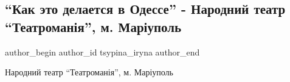  
 
 
 
 
 
\subsection{\enquote{Как это делается в Одессе} - Народний театр \enquote{Театроманія}, м. Маріуполь}
\label{sec:19_09_2018.fb.tsypina_iryna.1.kak_eto_delaetsja_v_odesse_teatromania_mariupol}
 
\ifcmt
 author_begin
   author_id tsypina_iryna
 author_end
\fi

Народний театр \enquote{Театроманія}, м. Маріуполь
